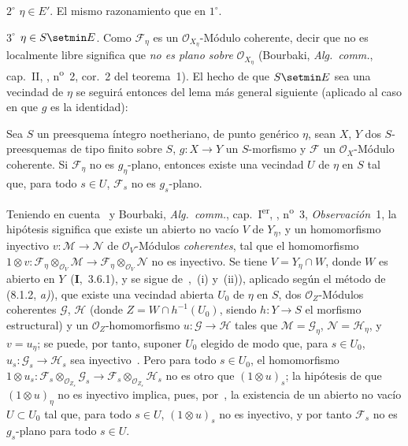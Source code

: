 $2^\circ$ $\eta\in E'$.
El mismo razonamiento que en $1^\circ$.

$3^\circ$ $\eta\in S\setmin E$.
Como $\mathcal F_\eta$ es un $\mathcal O_{X_\eta}$-Módulo coherente, decir que no es localmente libre significa que \emph{no es plano sobre} $\mathcal O_{X_\eta}$ (Bourbaki, \emph{Alg.\ comm.}, cap.~II, , n\textsuperscript{o}~2, cor.~2 del teorema~1).
El hecho de que $S\setmin E$ sea una vecindad de $\eta$ se seguirá entonces del lema más general siguiente (aplicado al caso en que $g$ es la identidad):

\begin{lemma}[9.4.7.1]
\label{IV.9.4.7.1}
Sea $S$ un preesquema íntegro noetheriano, de punto genérico $\eta$, sean $X$, $Y$ dos $S$-preesquemas de tipo finito sobre $S$, $g:X\to Y$ un $S$-morfismo y $\mathcal F$ un $\mathcal O_X$-Módulo coherente.
Si $\mathcal F_\eta$ no es $g_\eta$-plano, entonces existe una vecindad $U$ de $\eta$ en $S$ tal que, para todo $s\in U$, $\mathcal F_s$ no es $g_s$-plano.
\end{lemma}

Teniendo en cuenta~ y Bourbaki, \emph{Alg.\ comm.}, cap.~I\textsuperscript{er}, , n\textsuperscript{o}~3, \emph{Observación}~1, la hipótesis significa que existe un abierto no vacío $V$ de $Y_\eta$, y un homomorfismo inyectivo $v:\mathcal M\to\mathcal N$ de $\mathcal O_V$-Módulos \emph{coherentes}, tal que el homomorfismo $1\otimes v:\mathcal F_\eta\otimes_{\mathcal O_V}\mathcal M\to
\mathcal F_\eta\otimes_{\mathcal O_V}\mathcal N$ no es inyectivo.
Se tiene $V=Y_\eta\cap W$, donde $W$ es abierto en $Y$~(\textbf{I},~3.6.1), y se sigue de~,~(i) y~(ii)), aplicado según el método de (8.1.2, \emph{a)}), que existe una vecindad abierta $U_0$ de $\eta$ en $S$, dos $\mathcal O_Z$-Módulos
coherentes $\mathcal G$, $\mathcal H$ (donde $Z=W\cap h^{-1}(U_0)$, siendo $h:Y\to S$ el morfismo estructural) y un $\mathcal O_Z$-homomorfismo $u:\mathcal G\to\mathcal H$ tales que $\mathcal M=\mathcal G_\eta$, $\mathcal N=\mathcal H_\eta$, y $v=u_\eta$; se puede, por tanto, suponer $U_0$ elegido de modo que, para $s\in U_0$, $u_s:\mathcal G_s\to\mathcal H_s$ sea inyectivo~.
Pero para todo $s\in U_0$, el homomorfismo $1\otimes u_s:\mathcal F_s\otimes_{\mathcal O_{Z_s}}\mathcal G_s\to
\mathcal F_s\otimes_{\mathcal O_{Z_s}}\mathcal H_s$ no es otro que $(1\otimes u)_s$; la hipótesis de que $(1\otimes u)_\eta$ no es inyectivo implica, pues, por~, la existencia de un abierto no vacío $U\subset U_0$ tal que, para todo $s\in U$, $(1\otimes u)_s$ no es inyectivo, y por tanto $\mathcal F_s$ no es $g_s$-plano para todo $s\in U$.

